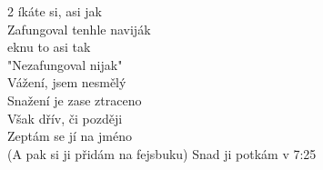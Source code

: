 \begin{multicols}{2}
\re{*}íkáte si, asi jak\\
Zafungoval tenhle naviják\\
eknu to asi tak\\
"Nezafungoval nijak"\\
Vážení, jsem nesmělý\\
Snažení je zase ztraceno\\
Však dřív, či později\\
Zeptám se jí na jméno\\
(A pak si ji přidám na fejsbuku)
\cho{}
\vspace{-5px}
\re{}Snad ji potkám v 7:25\\

\end{multicols}
\esong{}
\restoregeometry{}